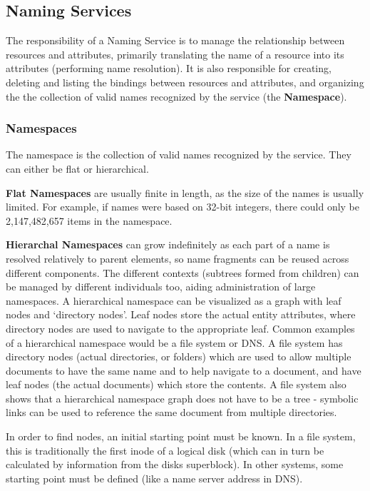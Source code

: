 \documentclass{article}
\begin{document}
\subsection{Naming Services}
The responsibility of a Naming Service is to manage the relationship between resources and attributes, primarily translating the name of a resource into its attributes (performing name resolution). It is also responsible for creating, deleting and listing the bindings between resources and attributes, and organizing the the collection of valid names recognized by the service (the \textbf{Namespace}). 

\subsubsection{Namespaces}
The namespace is the collection of valid names recognized by the service. They can either be flat or hierarchical. 

\textbf{Flat Namespaces} are usually finite in length, as the size of the names is usually limited. For example, if names were based on 32-bit integers, there could only be 2,147,482,657 items in the namespace. 

\textbf{Hierarchal Namespaces} can grow indefinitely as each part of a name is resolved relatively to parent elements, so name fragments can be reused across different components. The different contexts (subtrees formed from children) can be managed by different individuals too, aiding administration of large namespaces. A hierarchical namespace can be visualized as a graph with leaf nodes and `directory nodes'. Leaf nodes store the actual entity attributes, where directory nodes are used to navigate to the appropriate leaf. Common examples of a hierarchical namespace would be a file system or DNS. A file system has directory nodes (actual directories, or folders) which are used to allow multiple documents to have the same name and to help navigate to a document, and have leaf nodes (the actual documents) which store the contents. A file system also shows that a hierarchical namespace graph does not have to be a tree - symbolic links can be used to reference the same document from multiple directories. 

In order to find nodes, an initial starting point must be known. In a file system, this is traditionally the first inode of a logical disk (which can in turn be calculated by information from the disks superblock). In other systems, some starting point must be defined (like a name server address in DNS).
\end{document}
